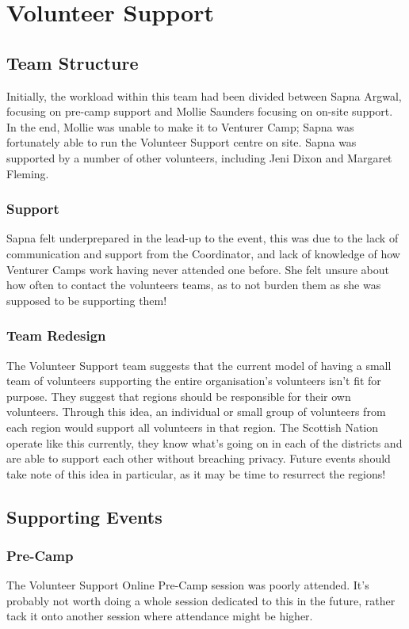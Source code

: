 \chapter{Volunteer Support}
\section{Team Structure}
Initially, the workload within this team had been divided between Sapna Argwal, focusing on pre-camp support and Mollie Saunders focusing on on-site support. In the end, Mollie was unable to make it to Venturer Camp; Sapna was fortunately able to run the Volunteer Support centre on site. Sapna was supported by a number of other volunteers, including Jeni Dixon and Margaret Fleming. 

\subsection{Support}
Sapna felt underprepared in the lead-up to the event, this was due to the lack of communication and support from the Coordinator, and lack of knowledge of how Venturer Camps work having never attended one before. She felt unsure about how often to contact the volunteers teams, as to not burden them as she was supposed to be supporting them!

\subsection{Team Redesign}
The Volunteer Support team suggests that the current model of having a small team of volunteers supporting the entire organisation's volunteers isn't fit for purpose. They suggest that regions should be responsible for their own volunteers. Through this idea, an individual or small group of volunteers from each region would support all volunteers in that region. The Scottish Nation operate like this currently, they know what's going on in each of the districts and are able to support each other without breaching privacy. Future events should take note of this idea in particular, as it may be time to resurrect the regions!

\section{Supporting Events}
\subsection{Pre-Camp}
The Volunteer Support Online Pre-Camp session was poorly attended. It's probably not worth doing a whole session dedicated to this in the future, rather tack it onto another session where attendance might be higher.\\

